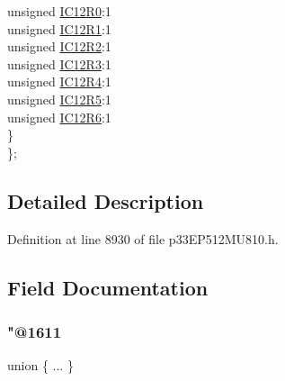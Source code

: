 \begin{DoxyCompactItemize}
\begin{tabbing}
\>\>unsigned \hyperlink{structtag_r_p_i_n_r34_b_i_t_s_a9d0c4a15666f8e517ac331c923c53aca}{IC12R0}:1\\
\>\>unsigned \hyperlink{structtag_r_p_i_n_r34_b_i_t_s_aabc9334a54e412959b2f527ef9c5fa0b}{IC12R1}:1\\
\>\>unsigned \hyperlink{structtag_r_p_i_n_r34_b_i_t_s_aaa2e41f2705cc460dbdc57733dc772f3}{IC12R2}:1\\
\>\>unsigned \hyperlink{structtag_r_p_i_n_r34_b_i_t_s_a43810f584f98ed75a8984bf54d858fab}{IC12R3}:1\\
\>\>unsigned \hyperlink{structtag_r_p_i_n_r34_b_i_t_s_a763487c0006155502a3c343953b447c6}{IC12R4}:1\\
\>\>unsigned \hyperlink{structtag_r_p_i_n_r34_b_i_t_s_a01c138f27fb62c09dff3fc9399540b11}{IC12R5}:1\\
\>\>unsigned \hyperlink{structtag_r_p_i_n_r34_b_i_t_s_ae6957699daafd8ce92358db8106cc338}{IC12R6}:1\\
\>\} \\
\}; \\

\end{tabbing}\end{DoxyCompactItemize}


\subsection{Detailed Description}


Definition at line 8930 of file p33\+E\+P512\+M\+U810.\+h.



\subsection{Field Documentation}
\mbox{\label{structtag_r_p_i_n_r34_b_i_t_s_a2e7ca6fe305d3c9f269755f97582f7fd}} 
\subsubsection{\texorpdfstring{"@1611}{@1611}}
{\footnotesize\ttfamily union \{ ... \} }

\mbox{\label{structtag_r_p_i_n_r34_b_i_t_s_adf71f3d8410c1f1dbbc96680a92c49af}} 
